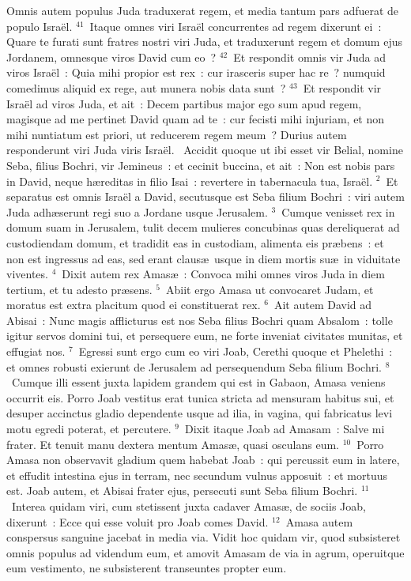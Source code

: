  Omnis autem populus Juda traduxerat regem, et media tantum pars adfuerat de populo Isra\"el.
${}^{41}$~Itaque omnes viri Isra\"el concurrentes ad regem dixerunt ei~: Quare te furati sunt fratres nostri viri Juda, et traduxerunt regem et domum ejus Jordanem, omnesque viros David cum eo~?
${}^{42}$~Et respondit omnis vir Juda ad viros Isra\"el~: Quia mihi propior est rex~: cur irasceris super hac re~? numquid comedimus aliquid ex rege, aut munera nobis data sunt~?
${}^{43}$~Et respondit vir Isra\"el ad viros Juda, et ait~: Decem partibus major ego sum apud regem, magisque ad me pertinet David quam ad te~: cur fecisti mihi injuriam, et non mihi nuntiatum est priori, ut reducerem regem meum~? Durius autem responderunt viri Juda viris Isra\"el.
~Accidit quoque ut ibi esset vir Belial, nomine Seba, filius Bochri, vir Jemineus~: et cecinit buccina, et ait~: Non est nobis pars in David, neque h\ae reditas in filio Isai~: revertere in tabernacula tua, Isra\"el.
${}^{2}$~Et separatus est omnis Isra\"el a David, secutusque est Seba filium Bochri~: viri autem Juda adh\ae serunt regi suo a Jordane usque Jerusalem.
${}^{3}$~Cumque venisset rex in domum suam in Jerusalem, tulit decem mulieres concubinas quas dereliquerat ad custodiendam domum, et tradidit eas in custodiam, alimenta eis pr\ae bens~: et non est ingressus ad eas, sed erant claus\ae\ usque in diem mortis su\ae\ in viduitate viventes.
${}^{4}$~Dixit autem rex Amas\ae~: Convoca mihi omnes viros Juda in diem tertium, et tu adesto pr\ae sens.
${}^{5}$~Abiit ergo Amasa ut convocaret Judam, et moratus est extra placitum quod ei constituerat rex.
${}^{6}$~Ait autem David ad Abisai~: Nunc magis afflicturus est nos Seba filius Bochri quam Absalom~: tolle igitur servos domini tui, et persequere eum, ne forte inveniat civitates munitas, et effugiat nos.
${}^{7}$~Egressi sunt ergo cum eo viri Joab, Cerethi quoque et Phelethi~: et omnes robusti exierunt de Jerusalem ad persequendum Seba filium Bochri.
${}^{8}$~Cumque illi essent juxta lapidem grandem qui est in Gabaon, Amasa veniens occurrit eis. Porro Joab vestitus erat tunica stricta ad mensuram habitus sui, et desuper accinctus gladio dependente usque ad ilia, in vagina, qui fabricatus levi motu egredi poterat, et percutere.
${}^{9}$~Dixit itaque Joab ad Amasam~: Salve mi frater. Et tenuit manu dextera mentum Amas\ae , quasi osculans eum.
${}^{10}$~Porro Amasa non observavit gladium quem habebat Joab~: qui percussit eum in latere, et effudit intestina ejus in terram, nec secundum vulnus apposuit~: et mortuus est. Joab autem, et Abisai frater ejus, persecuti sunt Seba filium Bochri.
${}^{11}$~Interea quidam viri, cum stetissent juxta cadaver Amas\ae , de sociis Joab, dixerunt~: Ecce qui esse voluit pro Joab comes David.
${}^{12}$~Amasa autem conspersus sanguine jacebat in media via. Vidit hoc quidam vir, quod subsisteret omnis populus ad videndum eum, et amovit Amasam de via in agrum, operuitque eum vestimento, ne subsisterent transeuntes propter eum.


